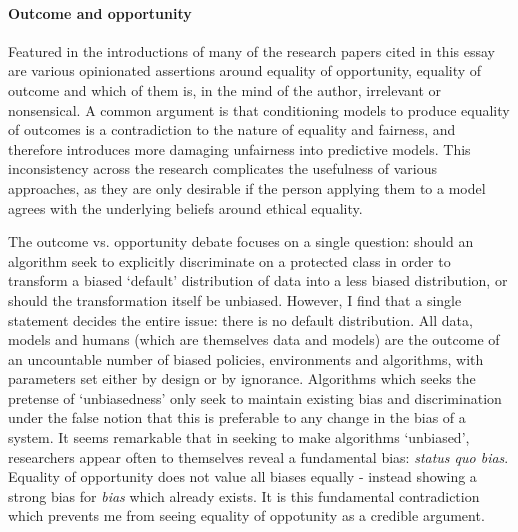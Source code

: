 \documentclass[conference]{IEEEtran}
\begin{document}
\paragraph{Outcome and opportunity}
Featured in the introductions of many of the research papers cited in this essay are various opinionated assertions around equality of opportunity, equality of outcome and which of them is, in the mind of the author, irrelevant or nonsensical. A common argument is that conditioning models to produce equality of outcomes is a contradiction to the nature of equality and fairness, and therefore introduces more damaging unfairness into predictive models. This inconsistency across the research complicates the usefulness of various approaches, as they are only desirable if the person applying them to a model agrees with the underlying beliefs around ethical equality.

The outcome vs. opportunity debate focuses on a single question: should an algorithm seek to explicitly discriminate on a protected class in order to transform a biased `default' distribution of data into a less biased distribution, or should the transformation itself be unbiased. However, I find that a single statement decides the entire issue: there is no default distribution. All data, models and humans (which are themselves data and models) are the outcome of an uncountable number of biased policies, environments and algorithms, with parameters set either by design or by ignorance. Algorithms which seeks the pretense of `unbiasedness' only seek to maintain existing bias and discrimination under the false notion that this is preferable to any change in the bias of a system. It seems remarkable that in seeking to make algorithms `unbiased', researchers appear often to themselves reveal a fundamental bias: \emph{status quo bias}. Equality of opportunity does not value all biases equally - instead showing a strong bias for \emph{bias} which already exists. It is this fundamental contradiction which prevents me from seeing equality of oppotunity as a credible argument. 
\pagebreak


\end{document}
